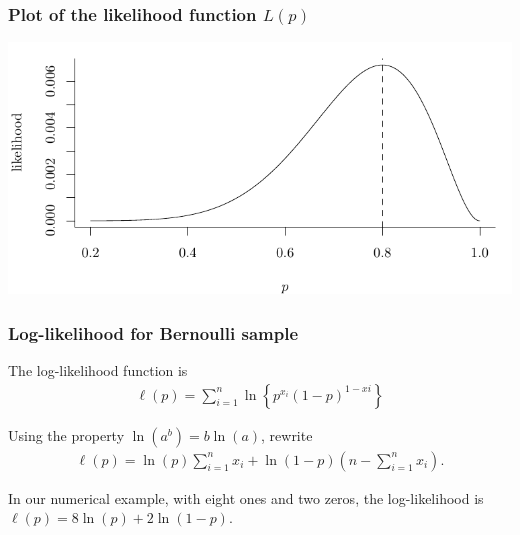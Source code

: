 \documentclass{beamer}
\begin{document}
 \begin{frame}[fragile]
\frametitle{Plot of the likelihood function $L(p)$}

\begin{center}
\includegraphics[width = \linewidth]{img/c3/05-likelihood.pdf}
\end{center}
\end{frame}
\begin{frame}
\frametitle{Log-likelihood for Bernoulli sample}
\bi
\item The log-likelihood function is
\begin{align*}
\ell(p)=\sum_{i=1}^n \ln\left\{p^{x_i}(1-p)^{1-xi}\right\}
\end{align*}
\item Using the property $\ln(a^b)=b\ln(a)$, rewrite
\begin{align*}
\ell(p)=\ln(p)\sum_{i=1}^n x_i + \ln(1-p) \left(n-\sum_{i=1}^n x_i\right).
\end{align*}
\item In our numerical example, with eight ones and two zeros, the log-likelihood is $\ell(p)=8 \ln(p) + 2 \ln(1-p)$.
\ei
\end{frame}

% 
\end{document}
